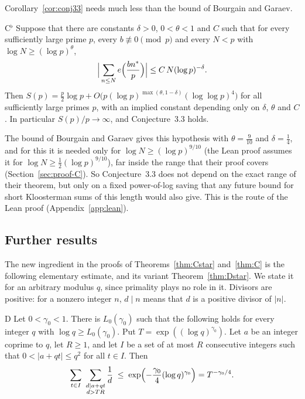 Corollary~\ref{cor:conj33} needs much less than the bound of Bourgain and Garaev.

\begin{namedthm}{C$^\flat$}\label{thm:Cflat}
Suppose that there are constants $\delta>0$, $0<\theta<1$ and $C$ such that for every sufficiently large prime $p$, every $b\not\equiv0\pmod p$ and every $N<p$ with $\log N\ge(\log p)^\theta$,
\[
\Big|\sum_{n\le N}e\Bigl(\frac{bn^*}p\Bigr)\Big|\le C\,N(\log p)^{-\delta}.
\]
Then $S(p)=\frac p2\log p+O\bigl(p(\log p)^{\max(\theta,1-\delta)}(\log\log p)^4\bigr)$ for all sufficiently large primes $p$, with an implied constant depending only on $\delta$, $\theta$ and $C$. In particular $S(p)/p\to\infty$, and Conjecture~\textup{3.3} holds.
\end{namedthm}

The bound of Bourgain and Garaev gives this hypothesis with $\theta=\frac9{10}$ and $\delta=\frac14$, and for this it is needed only for $\log N\ge(\log p)^{9/10}$ (the Lean proof assumes it for $\log N\ge\frac12(\log p)^{9/10}$), far inside the range that their proof covers (Section~\ref{sec:proof-C}). So Conjecture~3.3 does not depend on the exact range of their theorem, but only on a fixed power-of-log saving that any future bound for short Kloosterman sums of this length would also give. This is the route of the Lean proof (Appendix~\ref{app:lean}).

\subsection*{Further results}
The new ingredient in the proofs of Theorems~\ref{thm:Cstar} and~\ref{thm:C} is the following elementary estimate, and its variant Theorem~\ref{thm:Dstar}. We state it for an arbitrary modulus $q$, since primality plays no role in it. Divisors are positive: for a nonzero integer $n$, $d\mid n$ means that $d$ is a positive divisor of $|n|$.

\begin{namedthm}{D}\label{thm:D}
Let $0<\gamma_0<1$. There is $L_0(\gamma_0)$ such that the following holds for every integer $q$ with $\log q\ge L_0(\gamma_0)$. Put $T=\exp((\log q)^{\gamma_0})$. Let $a$ be an integer coprime to $q$, let $R\ge1$, and let $I$ be a set of at most $R$ consecutive integers such that $0<|a+qt|\le q^2$ for all $t\in I$. Then
\[
\sum_{t\in I}\ \sum_{\substack{d\mid a+qt\\ d>TR}}\frac1d\;\le\;\exp\Bigl(-\frac{\gamma_0}4(\log q)^{\gamma_0}\Bigr)=T^{-\gamma_0/4}.
\]
\end{namedthm}

